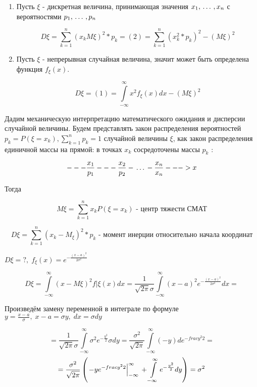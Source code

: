 ﻿\documentclass[a4paper,12pt]{report}
\begin{document}
	\begin{enumerate}
	
	\item Пусть $\xi$ - дискретная величина, принимающая значения $x_1, \,\ldots\,, x_n$ с вероятностями $p_1, \,\ldots\, ,p_n$

	$$
	  D\xi = \sum^n_{k=1}(x_k M\xi)^2*p_k = (2)
	       = \sum^n_{k=1}(x^2_k*p_k)^2 - (M\xi)^2
	$$

	\item Пусть $\xi$ - непрерывная случайная величина, значит может быть определена функция $f_\xi(x)$. 
	
	$$
	  D\xi = (1) = \int\limits_{-\infty}^\infty x^2 f_\xi(x) dx - (M\xi)^2
	$$

	\end{enumerate}


	Дадим механическую интерпретацию математического ожидания и дисперсии случайной величины. Будем представлять закон распределения вероятностей $p_k = P(\xi = x_k), \sum\limits^n_{k=1}p_k = 1$ случайной величины $\xi$, как закон распределения единичной массы на прямой: в точках $x_k$ сосредоточены массы $p_k$ : 
	
	$$
	  ---\frac{x_1}{p_1}---\frac{x_2}{p_2}- \,\ldots\, -\frac{x_n}{x_n}--->x
	$$
	
	Тогда 
	
	$$
	  M\xi = \sum^n_{k=1} x_k P(\xi=x_k) \mbox{ - центр тяжести СМАТ}	
	$$ 

	$$
	  D\xi = \sum^n_{k=1} (x_k - M_\xi)^2 * p_k \mbox{ - момент инерции относительно начала координат}
	$$

 	 $D\xi = ?, \; f_\xi(x) = e^{-\frac{(x-a)^2}{2\sigma^2}}$

 	
 	$$
 	  D\xi = \int\limits^\infty_{-\infty}(x-M\xi)^2 f|\xi(x) dx
 	       = \frac{1}{\sqrt{2\pi}\sigma}\int\limits^\infty_{-\infty} (x-a)^2 e^{-\frac{(x-a)^2}{2\sigma^2}} dx
 	       = 
 	$$
 
 	Произведём замену переменной в интеграле по формуле $y = \frac{x-a}{\sigma}, \; x - a = \sigma y, \; dx = \sigma dy$
 
 	$$
 	   = \frac{1}{\sqrt{2\pi}\sigma} \int\limits_{-\infty}^\infty \sigma^2 e^{-\frac{y^2}{2}} \sigma dy 
 	   = \frac{\sigma^2}{\sqrt{2\pi}}  \int\limits _{-\infty}^\infty (-y ) de^{-frac{y^2}{2}} 
	   = 	   
 	$$ $$
 	   = \frac{\sigma^2}{\sqrt{2\pi}} \left( \left. -ye^{-frac{y^2}{2}} \right|^\infty_{-\infty} \strut 
 	     + \int\limits_{-\infty}^\infty e^{-\frac{y^2}{2}} dy \right)
 	   = \sigma^2
 	 $$
 
\end{document}
